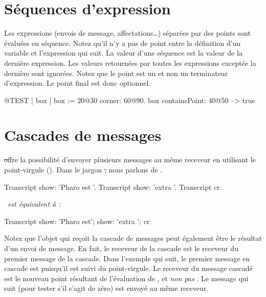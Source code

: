 \documentclass[a4paper,10pt,twoside]{book}
\begin{document}
\section{Séquences d'expression}
Les expressions (\ie envois de message, affectations\ldots) séparées par des points sont évaluées en séquence.
Notez qu'il n'y a pas de point entre la définition d'un variable et l'expression qui suit.
La valeur d'une séquence est la valeur de la dernière
expression. Les valeurs retournées par toutes les expressions
exceptée la dernière sont ignorées. Notez que le point est un 
et non un terminateur d'expression. Le point final est donc optionnel.

\begin{code}{@TEST}
| box |
box := 20@30 corner: 60@90.
box containsPoint: 40@50 --> true
\end{code}

\section{Cascades de messages}
\st offre la possibilité d'envoyer plusieurs messages au même
receveur en utilisant le point-virgule (\ct{;}). Dans le jargon \st,
nous parlons de .


\begin{minipage}{0.35\textwidth}
\begin{code}{}
Transcript show: 'Pharo est '.
Transcript show: 'extra '.
Transcript cr.
\end{code}
\end{minipage}
\emph{~est équivalent à :~}
\begin{minipage}{0.35\textwidth}
\begin{code}{}
Transcript        
   show: 'Pharo est';
   show: 'extra ';
   cr
\end{code}
\end{minipage}

Notez que l'objet qui reçoit la cascade de messages peut également être le résultat d'un envoi de message.
En fait, le receveur de la cascade est le receveur du premier message
de la cascade. Dans l'exemple qui suit, le premier message en cascade
est  puisqu'il est suivi du point-virgule. Le receveur
du message cascadé  est le nouveau point résultant
de l'évaluation de , et \emph{non pas} . Le
message qui suit  (pour tester s'il s'agit de zéro) est
envoyé au même receveur. 
\end{document}
